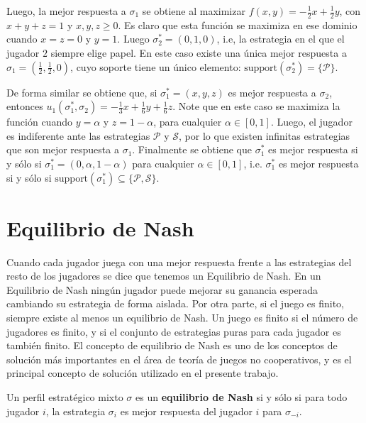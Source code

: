 Luego, la mejor respuesta a $\sigma_1$ se obtiene al maximizar $f(x, y) = -\frac{1}{2}x + \frac{1}{2}y$, con $x+y+z =1$ y $x, y, z \geq 0$. Es claro que esta función se maximiza en ese dominio cuando $x = z = 0$ y $y = 1$. Luego $\sigma^*_2 = (0, 1, 0)$, i.e, la estrategia en el que el jugador $2$ siempre elige papel. En este caso existe una única mejor respuesta a $\sigma_1 = \left(\frac{1}{2}, \frac{1}{2}, 0\right)$, cuyo soporte tiene un único elemento: $\text{support}(\sigma^*_2) = \{\mathcal{P}\}$.

De forma similar se obtiene que, si $\sigma^*_1 = (x, y, z)$ es mejor respuesta a $\sigma_2$, entonces $u_1(\sigma^*_1, \sigma_2) = -\frac{1}{3}x + \frac{1}{6}y + \frac{1}{6}z$. Note que en este caso se maximiza la función cuando $y = \alpha$ y $z = 1 -\alpha$, para cualquier $\alpha \in [0, 1]$. Luego, el jugador es indiferente ante las estrategias $\mathcal{P}$ y $\mathcal{S}$, por lo que existen infinitas estrategias que son mejor respuesta a $\sigma_1$. Finalmente se obtiene que $\sigma^*_1$ es mejor respuesta si y sólo si $\sigma^*_1 = (0, \alpha, 1 - \alpha)$ para cualquier  $\alpha \in [0, 1]$, i.e. $\sigma^*_1$ es mejor respuesta si y sólo si $\text{support}(\sigma^*_1) \subseteq \{\mathcal{P}, \mathcal{S} \}$.

\section{Equilibrio de Nash}
Cuando cada jugador juega con una mejor respuesta frente a las estrategias del resto de los jugadores se dice que tenemos un Equilibrio de Nash. En un Equilibrio de Nash ningún jugador puede mejorar su ganancia esperada cambiando su estrategia de forma aislada. Por otra parte, si el juego es finito, siempre existe al menos un equilibrio de Nash. Un juego es finito si el número de jugadores es finito, y si el conjunto de estrategias puras para cada jugador es también finito. El concepto de equilibrio de Nash es uno de los conceptos de solución más importantes en el área de teoría de juegos no cooperativos, y es el principal concepto de solución utilizado en el presente trabajo.

\begin{definition}
\label{def:equilibrio-nash} Un perfil estratégico mixto $\sigma$ es un \textbf{equilibrio de Nash} si y s\'olo si para todo jugador $i$, la estrategia $\sigma_i$ es mejor respuesta del jugador $i$ para $\sigma_{-i}$.
\end{definition}

